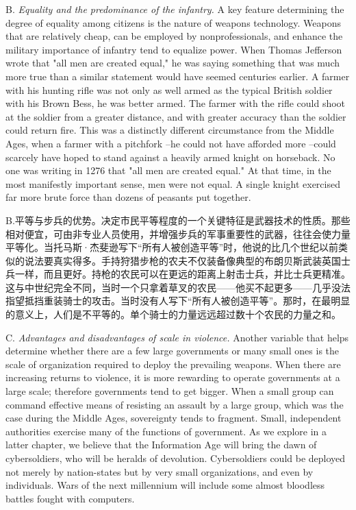 \begin{Parallel}{97mm}{45mm}
  \ParallelLText
  {B. \emph{Equality and the predominance of the infantry.} A key feature determining the degree of equality among citizens is the nature of weapons technology. Weapons that are relatively cheap, can be employed by nonprofessionals, and enhance the military importance of infantry tend to equalize power. When Thomas Jefferson wrote that "all men are created equal," he was saying something that was much more true than a similar statement would have seemed centuries earlier. A farmer with his hunting rifle was not only as well armed as the typical British soldier with his Brown Bess, he was better armed. The farmer with the rifle could shoot at the soldier from a greater distance, and with greater accuracy than the soldier could return fire. This was a distinctly different circumstance from the Middle Ages, when a farmer with a pitchfork --he could not have afforded more --could scarcely have hoped to stand against a heavily armed knight on horseback. No one was writing in 1276 that "all men are created equal." At that time, in the most manifestly important sense, men were not equal. A single knight exercised far more brute force than dozens of peasants put together.}
  
  \ParallelRText
  {B.平等与步兵的优势。决定市民平等程度的一个关键特征是武器技术的性质。那些相对便宜，可由非专业人员使用，并增强步兵的军事重要性的武器，往往会使力量平等化。当托马斯·杰斐逊写下“所有人被创造平等”时，他说的比几个世纪以前类似的说法要真实得多。手持狩猎步枪的农夫不仅装备像典型的布朗贝斯武装英国士兵一样，而且更好。持枪的农民可以在更远的距离上射击士兵，并比士兵更精准。这与中世纪完全不同，当时一个只拿着草叉的农民——他买不起更多——几乎没法指望抵挡重装骑士的攻击。当时没有人写下“所有人被创造平等”。那时，在最明显的意义上，人们是不平等的。单个骑士的力量远远超过数十个农民的力量之和。}
  \ParallelPar


  \ParallelLText
  {C. \emph{Advantages and disadvantages of scale in violence.} Another variable that helps determine whether there are a few large governments or many small ones is the scale of organization required to deploy the prevailing weapons. When there are increasing returns to violence, it is more rewarding to operate governments at a large scale; therefore governments tend to get bigger. When a small group can command effective means of resisting an assault by a large group, which was the case during the Middle Ages, sovereignty tends to fragment. Small, independent authorities exercise many of the functions of government. As we explore in a latter chapter, we believe that the Information Age will bring the dawn of cybersoldiers, who will be heralds of devolution. Cybersoldiers could be deployed not merely by nation-states but by very small organizations, and even by individuals. Wars of the next millennium will include some almost bloodless battles fought with computers.    }
  

\end{Parallel}
